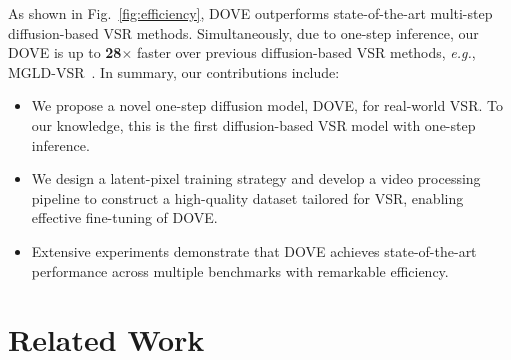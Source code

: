 \documentclass{article}
\newcommand\eg{\textit{e.g.}}
\begin{document}
As shown in Fig.~\ref{fig:efficiency}, DOVE outperforms state-of-the-art multi-step diffusion-based VSR methods. Simultaneously, due to one-step inference, our DOVE is up to \textbf{28$\times$} faster over previous diffusion-based VSR methods, \eg, MGLD-VSR~\cite{yang2024motion}. In summary, our contributions include:

\vspace{-1.mm}
\begin{itemize}
\vspace{-1.mm}
\item We propose a novel one-step diffusion model, DOVE, for real-world VSR. To our knowledge, this is the first diffusion-based VSR model with one-step inference.

\vspace{-1.mm}
\item We design a latent-pixel training strategy and develop a video processing pipeline to construct a high-quality dataset tailored for VSR, enabling effective fine-tuning of DOVE.

\vspace{-1.mm}
\item Extensive experiments demonstrate that DOVE achieves state-of-the-art performance across multiple benchmarks with remarkable efficiency.
\end{itemize}

\section{Related Work}
\end{document}
